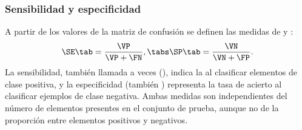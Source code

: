 %
\subsubsection{Sensibilidad y especificidad}
%
A partir de los valores de la matriz de confusión se definen las
medidas de  y :
%
\begin{align}
  \SE \tab = \frac{\VP}{\VP+\FN}, \tabs \SP \tab = \frac{\VN}{\VN+\FP}.
\end{align}
%
La sensibilidad, también llamada a veces  (), indica la  al clasificar
elementos de clase positiva, y la especificidad (también ) representa la tasa de acierto al clasificar
ejemplos de clase negativa.
Ambas medidas son independientes del
número de elementos presentes en el conjunto de prueba, aunque no de
la proporción entre elementos positivos y negativos.
